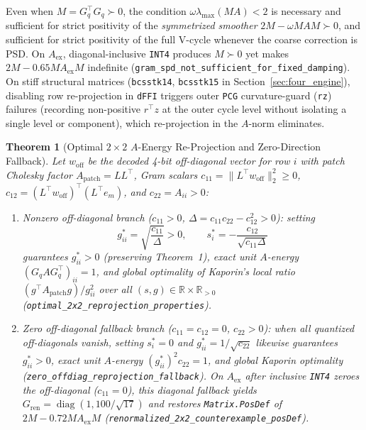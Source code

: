 \documentclass[10pt]{article}
\newtheorem{theorem}{Theorem}
\begin{document}
Even when $M = G_q^\top G_q \succ 0$, the condition $\omega \lambda_{\max}(M A) < 2$ is necessary and sufficient for strict positivity of the \emph{symmetrized smoother} $2M - \omega M A M \succ 0$, and sufficient for strict positivity of the full V-cycle whenever the coarse correction is PSD. On $A_{\mathrm{ex}}$, diagonal-inclusive \texttt{INT4} produces $M \succ 0$ yet makes $2M - 0.65 M A_{\mathrm{ex}} M$ indefinite (\texttt{gram\_spd\_not\_sufficient\_for\_fixed\_damping}). On stiff structural matrices (\texttt{bcsstk14}, \texttt{bcsstk15} in Section~\ref{sec:four_engine}), disabling row re-projection in \texttt{dFFI} triggers outer \texttt{PCG} curvature-guard (\texttt{rz}) failures (recording non-positive $r^\top z$ at the outer cycle level without isolating a single level or component), which re-projection in the $A$-norm eliminates.

\begin{theorem}[Optimal $2\times 2$ $A$-Energy Re-Projection and Zero-Direction Fallback]
Let $w_{\mathrm{off}}$ be the decoded 4-bit off-diagonal vector for row $i$ with patch Cholesky factor $A_{\mathrm{patch}} = L L^\top$, Gram scalars $c_{11} = \|L^\top w_{\mathrm{off}}\|_2^2 \ge 0$, $c_{12} = (L^\top w_{\mathrm{off}})^\top(L^\top e_m)$, and $c_{22} = A_{ii} > 0$:
\begin{enumerate}
  \item \emph{Nonzero off-diagonal branch ($c_{11} > 0$, $\Delta = c_{11}c_{22} - c_{12}^2 > 0$):} setting
  \[
    g_{ii}^* = \sqrt{\frac{c_{11}}{\Delta}} > 0, \qquad s_i^* = -\frac{c_{12}}{\sqrt{c_{11}\Delta}}
  \]
  guarantees $g_{ii}^* > 0$ (preserving Theorem~1), exact unit $A$-energy $(G_q A G_q^\top)_{ii} = 1$, and global optimality of Kaporin's local ratio $(g^\top A_{\mathrm{patch}} g)/g_{ii}^2$ over all $(s,g) \in \mathbb{R}\times\mathbb{R}_{>0}$ (\texttt{optimal\_2x2\_reprojection\_properties}).
  \item \emph{Zero off-diagonal fallback branch ($c_{11} = c_{12} = 0$, $c_{22} > 0$):} when all quantized off-diagonals vanish, setting $s_i^* = 0$ and $g_{ii}^* = 1/\sqrt{c_{22}}$ likewise guarantees $g_{ii}^* > 0$, exact unit $A$-energy $(g_{ii}^*)^2 c_{22} = 1$, and global Kaporin optimality (\texttt{zero\_offdiag\_reprojection\_fallback}). On $A_{\mathrm{ex}}$ after inclusive \texttt{INT4} zeroes the off-diagonal ($c_{11} = 0$), this diagonal fallback yields $G_{\mathrm{ren}} = \operatorname{diag}(1, 100/\sqrt{17})$ and restores \texttt{Matrix.PosDef} of $2M - 0.72 M A_{\mathrm{ex}} M$ (\texttt{renormalized\_2x2\_counterexample\_posDef}).
\end{enumerate}
\end{theorem}
\end{document}
